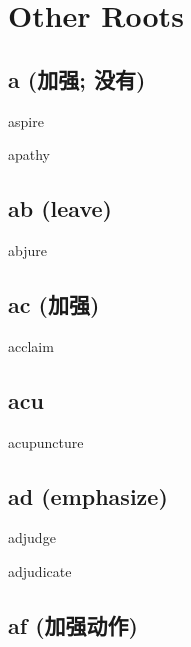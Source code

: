 \chapter{Other Roots}

\section{a (加强; 没有)}

\begin{RefWord}{aspire}
\end{RefWord}

\begin{RefWord}{apathy}
\end{RefWord}


\section{ab (leave)}
\begin{RefWord}{abjure}
\end{RefWord}


\section{ac (加强)}

\begin{RefWord}{acclaim}
\end{RefWord}


\section{acu}

\begin{RefWord}{acupuncture}
    
\end{RefWord}


\section{ad (emphasize)}
\begin{RefWord}{adjudge}
\end{RefWord}

\begin{RefWord}{adjudicate}
\end{RefWord}



\section{af (加强动作)}

